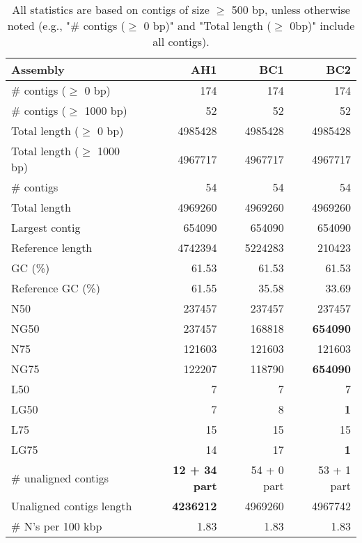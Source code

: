 \documentclass[12pt,a4paper]{article}
\begin{document}
\begin{table}[ht]
\begin{center}
\caption{All statistics are based on contigs of size $\geq$ 500 bp, unless otherwise noted (e.g., "\# contigs ($\geq$ 0 bp)" and "Total length ($\geq$ 0bp)" include all contigs).}
\begin{tabular}{|l*{3}{|r}|}
\hline
Assembly & AH1 & BC1 & BC2 \\ \hline
\# contigs ($\geq$ 0 bp) & 174 & 174 & 174 \\ \hline
\# contigs ($\geq$ 1000 bp) & 52 & 52 & 52 \\ \hline
Total length ($\geq$ 0 bp) & 4985428 & 4985428 & 4985428 \\ \hline
Total length ($\geq$ 1000 bp) & 4967717 & 4967717 & 4967717 \\ \hline
\# contigs & 54 & 54 & 54 \\ \hline
Total length & 4969260 & 4969260 & 4969260 \\ \hline
Largest contig & 654090 & 654090 & 654090 \\ \hline
Reference length & 4742394 & 5224283 & 210423 \\ \hline
GC (\%) & 61.53 & 61.53 & 61.53 \\ \hline
Reference GC (\%) & 61.55 & 35.58 & 33.69 \\ \hline
N50 & 237457 & 237457 & 237457 \\ \hline
NG50 & 237457 & 168818 & {\bf 654090} \\ \hline
N75 & 121603 & 121603 & 121603 \\ \hline
NG75 & 122207 & 118790 & {\bf 654090} \\ \hline
L50 & 7 & 7 & 7 \\ \hline
LG50 & 7 & 8 & {\bf 1} \\ \hline
L75 & 15 & 15 & 15 \\ \hline
LG75 & 14 & 17 & {\bf 1} \\ \hline
\# unaligned contigs & {\bf 12 + 34 part} & 54 + 0 part & 53 + 1 part \\ \hline
Unaligned contigs length & {\bf 4236212} & 4969260 & 4967742 \\ \hline
\# N's per 100 kbp & 1.83 & 1.83 & 1.83 \\ \hline
\end{tabular}
\end{center}
\end{table}
\end{document}
